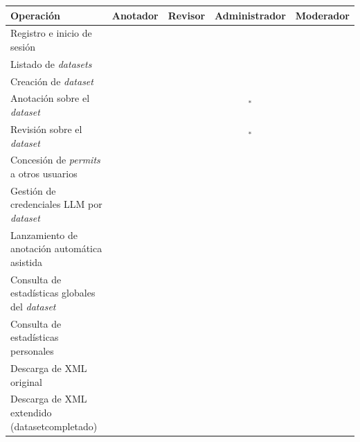 \begin{table}[ht]
	\centering
	\footnotesize
	\begin{tabular}{p{5.4cm}cccc}
		\hline
		\textbf{Operación}                                                   & \textbf{Anotador} & \textbf{Revisor} & \textbf{Administrador} & \textbf{Moderador} \\
		\hline
		Registro e inicio de sesión                                          & \checkmark        & \checkmark       & \checkmark             & \checkmark         \\
		Listado de \textit{datasets}                                         & \checkmark        & \checkmark       & \checkmark             & \checkmark         \\
		Creación de \textit{dataset}                                         &                   &                  &                        & \checkmark         \\
		Anotación sobre el \textit{dataset}                                  & \checkmark        &                  & \checkmark$^{*}$       &                    \\
		Revisión sobre el \textit{dataset}                                   &                   & \checkmark       & \checkmark$^{*}$       &                    \\
		Concesión de \textit{permits} a otros usuarios                       &                   &                  & \checkmark             &                    \\
		Gestión de credenciales LLM por \textit{dataset}                     &                   &                  & \checkmark             &                    \\
		Lanzamiento de anotación automática asistida                         &                   &                  & \checkmark             &                    \\
		Consulta de estadísticas globales del \textit{dataset}               &                   &                  & \checkmark             &                    \\
		Consulta de estadísticas personales                                  & \checkmark        & \checkmark       & \checkmark             & \checkmark         \\
		Descarga de XML original                                             & \checkmark        & \checkmark       & \checkmark             & \checkmark         \\
		Descarga de XML extendido (dataset\newline completado)               & \checkmark        & \checkmark       & \checkmark             & \checkmark         \\

\end{tabular}
\end{table}
